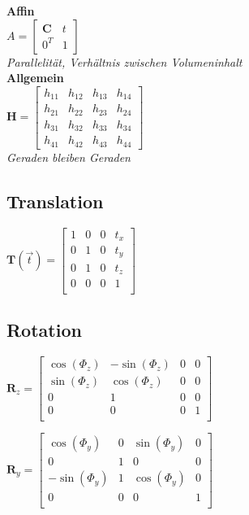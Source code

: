 \textbf{Affin} \\
$A = \begin{bmatrix}
    \mathbf{C} & t \\
    0^T & 1
\end{bmatrix}$ \\
\textit{Parallelität, Verhältnis zwischen Volumeninhalt} \\

\textbf{Allgemein} \\
$\mathbf{H} = \begin{bmatrix}
    h_{11} & h_{12} & h_{13} & h_{14} \\
    h_{21} & h_{22} & h_{23} & h_{24} \\
    h_{31} & h_{32} & h_{33} & h_{34} \\
    h_{41} & h_{42} & h_{43} & h_{44}
\end{bmatrix}$ \\
\textit{Geraden bleiben Geraden} \\

\subsection{Translation}

$\mathbf{T}(\vec{t}) = \left[\begin{array}{ccc|c}
    1 & 0 & 0 & t_x \\
    0 & 1 & 0 & t_y \\
    0 & 1 & 0 & t_z \\
    \hline
    0 & 0 & 0 & 1 \\
\end{array}\right]$

\subsection{Rotation}

$\mathbf{R}_z = \left[\begin{array}{ccc|c}
    \cos(\Phi_z) & -\sin(\Phi_z) & 0 & 0 \\
    \sin(\Phi_z) & \cos(\Phi_z) & 0 & 0 \\
    0 & 1 & 0 & 0 \\
    \hline
    0 & 0 & 0 & 1 \\
\end{array}\right]$

$\mathbf{R}_y = \left[\begin{array}{ccc|c}
    \cos(\Phi_y) & 0 & \sin(\Phi_y) & 0 \\
    0 & 1 & 0 & 0 \\
    -\sin(\Phi_y) & 1 & \cos(\Phi_y) & 0 \\
    \hline
    0 & 0 & 0 & 1 \\
\end{array}\right]$

